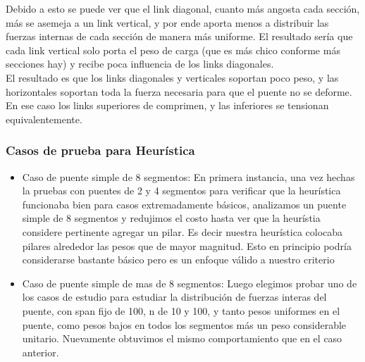 Debido a esto se puede ver que el link diagonal, cuanto más angosta cada sección, más se asemeja a un link vertical, y por ende aporta menos a distribuir las fuerzas internas de cada sección de manera más uniforme. El resultado sería que cada link vertical solo porta el peso de carga (que es más chico conforme más secciones hay) y recibe poca influencia de los links diagonales.\\

El resultado es que los links diagonales y verticales soportan poco peso, y las horizontales soportan toda la fuerza necesaria para que el puente no se deforme.\\

En ese caso los links superiores de comprimen, y las inferiores se tensionan equivalentemente.

\subsubsection{Casos de prueba para Heurística}

\begin{itemize}
	\item Caso de puente simple de 8 segmentos: En primera instancia, una vez hechas la pruebas con puentes de
2 y 4 segmentos para verificar que la heurística funcionaba bien para casos
extremadamente básicos, analizamos un puente simple de 8 segmentos y redujimos
el costo hasta ver que la heurístia considere pertinente agregar un pilar. Es decir nuestra heurística colocaba pilares alrededor las pesos que de mayor magnitud. Esto en principio podría considerarse bastante básico pero es un enfoque válido a nuestro criterio
	\item Caso de puente simple de mas de 8 segmentos:	Luego elegimos probar uno de los casos de estudio para estudiar la
distribución de fuerzas interas del puente, con span fijo de 100,
n de 10 y 100, y tanto pesos uniformes en el puente, como pesos
bajos en todos los segmentos más un peso considerable unitario. Nuevamente obtuvimos el mismo comportamiento que en el caso anterior.
\end{itemize}
